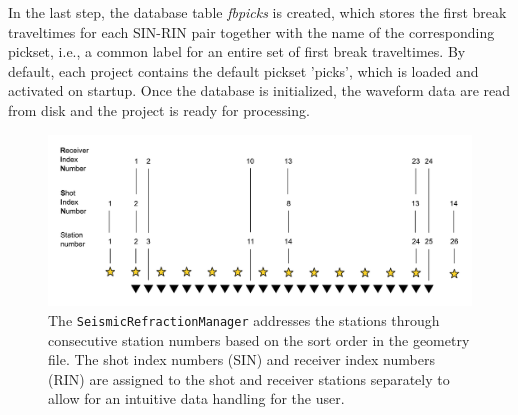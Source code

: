 \documentclass[a4paper,fleqn]{cas-sc}
\begin{document}
In the last step, the database table \textit{fbpicks} is created, which stores the first break traveltimes for each SIN-RIN pair together with the name of the corresponding pickset, i.e., a common label for an entire set of first break traveltimes. By default, each project contains the default pickset 'picks', which is loaded and activated on startup. Once the database is initialized, the waveform data are read from disk and the project is ready for processing.
\begin{figure}
	\centering
	\includegraphics[width=.75\textwidth]{figures/station_numbering.pdf}
	\caption{The \texttt{SeismicRefractionManager} addresses the stations through consecutive station numbers based on the sort order in the geometry file. The shot index numbers (SIN) and receiver index numbers (RIN) are assigned to the shot and receiver stations separately to allow for an intuitive data handling for the user.}
	\label{fig:statnum}
\end{figure}
\end{document}
